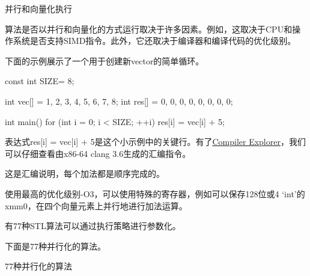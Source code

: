 \begin{myTip}{并行和向量化执行}

算法是否以并行和向量化的方式运行取决于许多因素。例如，这取决于CPU和操作系统是否支持SIMD指令。此外，它还取决于编译器和编译代码的优化级别。

下面的示例展示了一个用于创建新vector的简单循环。

\begin{cpp}
const int SIZE= 8;

int vec[] = {1, 2, 3, 4, 5, 6, 7, 8};
int res[] = {0, 0, 0, 0, 0, 0, 0, 0};

int main(){
	for (int i = 0; i < SIZE; ++i) {
		res[i] = vec[i] + 5;
	}
}
\end{cpp}

表达式res[i] = vec[i] + 5是这个小示例中的关键行。有了\href{https://godbolt.org/}{Compiler Explorer}，我们可以仔细查看由x86-64 clang 3.6生成的汇编指令。


这是汇编说明，每个加法都是顺序完成的。




使用最高的优化级别-O3，可以使用特殊的寄存器，例如可以保存128位或4 ‘int’的xmm0，在四个向量元素上并行地进行加法运算。


\end{myTip}

有77种STL算法可以通过执行策略进行参数化。


下面是77种并行化的算法。

\begin{center}
77种并行化的算法
\end{center}

